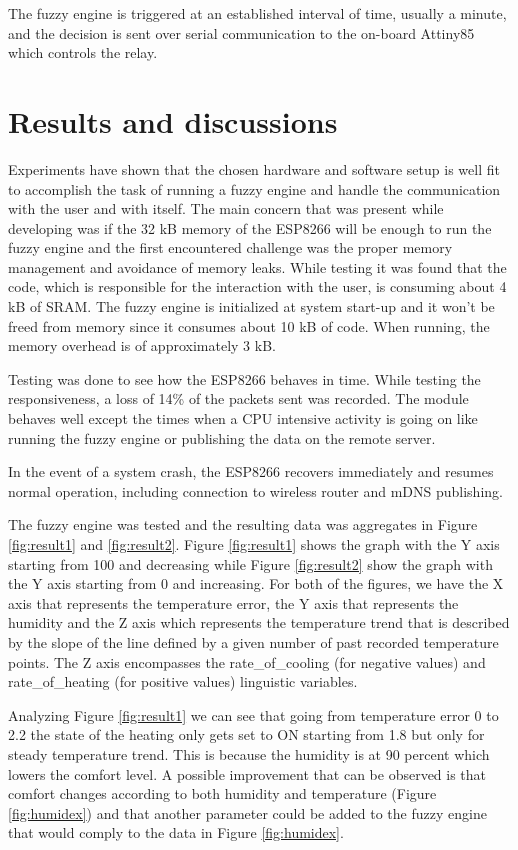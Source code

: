 \documentclass[conference]{IEEEtran}
\let\Oldsection\section
\renewcommand{\section}{\FloatBarrier\Oldsection}
\begin{document}
The fuzzy engine is triggered at an established interval of time, usually a minute, and the decision is sent over
serial communication to the on-board Attiny85 which controls the relay.

\section{Results and discussions}
\label{Results and discussions}

Experiments have shown that the chosen hardware and software setup is well fit to accomplish the task of
running a fuzzy engine and handle the communication with the user and with itself.
The main concern that was present while developing was if the 32 kB memory of the ESP8266 will be enough to run
the fuzzy engine and the first encountered challenge was the proper memory management and avoidance of memory leaks.
While testing it was found that the  code, which is responsible for the interaction with
the user, is consuming about 4 kB of SRAM.
The fuzzy engine is initialized at system start-up and it won't be freed from memory since it consumes about 10 kB of code. When running, the memory overhead is of approximately 3 kB.

Testing was done to see how the ESP8266 behaves in time. While testing the responsiveness, a
loss of 14\% of the packets sent was recorded. The module behaves well except the times when a CPU intensive activity is going on like running the fuzzy engine or publishing the data on the remote server.

In the event of a system crash, the ESP8266 recovers immediately and resumes normal operation, including connection
to wireless router and mDNS publishing.

The fuzzy engine was tested and the resulting data was aggregates in Figure \ref{fig:result1} and
\ref{fig:result2}. Figure \ref{fig:result1} shows the graph with the Y axis starting from 100 and decreasing
while Figure \ref{fig:result2} show the graph with the Y axis starting from 0 and increasing.
For both of the figures, we have the X axis that represents the temperature error, the Y axis that represents
the humidity and the Z axis which represents the temperature trend that is described by the slope of the
line defined by a given number of past recorded temperature points. The Z axis encompasses the
rate\_of\_cooling (for negative values) and rate\_of\_heating (for positive values) linguistic variables.

Analyzing Figure \ref{fig:result1} we can see that going from temperature error 0 to 2.2
the state of the heating only gets set to ON starting from 1.8 but only for steady temperature trend. This is
because the humidity is at 90 percent which lowers the comfort level. A possible improvement that can be
observed is that comfort changes according to both humidity and temperature (Figure \ref{fig:humidex}) and
that another parameter could be added to the fuzzy engine that would comply to the data in Figure
\ref{fig:humidex}.
\end{document}
